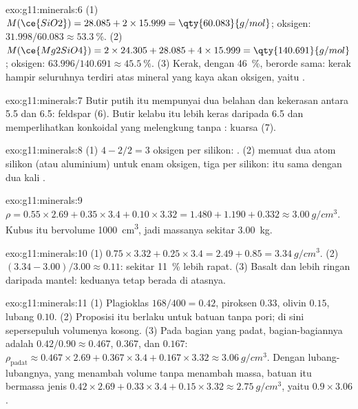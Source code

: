 \begin{solution}{exo:g11:minerals:6}
(1) $M(\ce{SiO2}) = 28.085 + 2 \times 15.999 = \qty{60.083}{g/mol}$;
oksigen: $31.998/60.083 \approx \qty{53.3}{\percent}$.
(2) $M(\ce{Mg2SiO4}) = 2 \times 24.305 + 28.085 + 4 \times 15.999 =
\qty{140.691}{g/mol}$; oksigen: $63.996/140.691 \approx \qty{45.5}{\percent}$.
(3) Kerak, dengan \qty{46}{\percent}, berorde sama: kerak hampir seluruhnya
terdiri atas mineral yang kaya akan oksigen, yaitu .
\end{solution}

\begin{solution}{exo:g11:minerals:7}
Butir putih itu mempunyai dua belahan dan kekerasan antara 5.5 dan 6.5:
feldspar (6). Butir kelabu itu lebih keras daripada 6.5 dan memperlihatkan
 konkoidal yang melengkung tanpa : kuarsa (7).
\end{solution}

\begin{solution}{exo:g11:minerals:8}
(1) $4 - 2/2 = 3$ oksigen per silikon: . (2)  memuat
dua atom silikon (atau aluminium) untuk enam oksigen, tiga per silikon: itu sama
dengan dua kali .
\end{solution}

\begin{solution}{exo:g11:minerals:9}
$\rho = 0.55 \times 2.69 + 0.35 \times 3.4 + 0.10 \times 3.32 = 1.480 + 1.190
+ 0.332 \approx \qty{3.00}{g/cm^3}$. Kubus itu bervolume
\qty{1000}{cm^3}, jadi massanya sekitar \qty{3.00}{kg}.
\end{solution}

\begin{solution}{exo:g11:minerals:10}
(1) $0.75 \times 3.32 + 0.25 \times 3.4 = 2.49 + 0.85 = \qty{3.34}{g/cm^3}$.
(2) $(3.34 - 3.00)/3.00 \approx 0.11$: sekitar \qty{11}{\percent} lebih rapat.
(3) Basalt dan   lebih ringan daripada  mantel:
keduanya tetap berada di atasnya.
\end{solution}

\begin{solution}{exo:g11:minerals:11}
(1) Plagioklas $168/400 = 0.42$, piroksen $0.33$, olivin $0.15$, lubang
$0.10$. (2) Proposisi itu berlaku untuk batuan tanpa pori; di sini sepersepuluh
volumenya kosong. (3) Pada bagian yang padat, bagian-bagiannya adalah $0.42/0.90
\approx 0.467$, $0.367$, dan $0.167$:
$\rho_{\text{padat}} \approx 0.467 \times 2.69 + 0.367 \times 3.4 + 0.167
\times 3.32 \approx \qty{3.06}{g/cm^3}$. Dengan lubang-lubangnya, yang menambah
volume tanpa menambah massa, batuan itu bermassa jenis $0.42 \times 2.69 + 0.33 \times 3.4 +
0.15 \times 3.32 \approx \qty{2.75}{g/cm^3}$, yaitu $0.9 \times 3.06$.
\end{solution}

